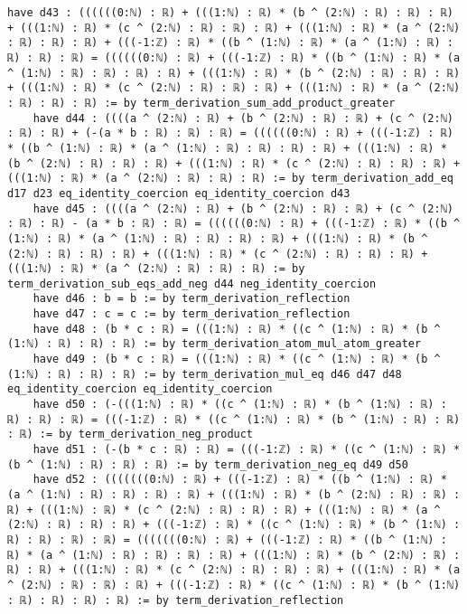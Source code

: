\documentclass{article}
\begin{document}
\begin{tcolorbox}[colback=white!10, width=\linewidth]
\begin{lstlisting}[language=Lean4]
    have d43 : ((((((0:ℕ) : ℝ) + (((1:ℕ) : ℝ) * (b ^ (2:ℕ) : ℝ) : ℝ) : ℝ) + (((1:ℕ) : ℝ) * (c ^ (2:ℕ) : ℝ) : ℝ) : ℝ) + (((1:ℕ) : ℝ) * (a ^ (2:ℕ) : ℝ) : ℝ) : ℝ) + (((-1:ℤ) : ℝ) * ((b ^ (1:ℕ) : ℝ) * (a ^ (1:ℕ) : ℝ) : ℝ) : ℝ) : ℝ) = ((((((0:ℕ) : ℝ) + (((-1:ℤ) : ℝ) * ((b ^ (1:ℕ) : ℝ) * (a ^ (1:ℕ) : ℝ) : ℝ) : ℝ) : ℝ) + (((1:ℕ) : ℝ) * (b ^ (2:ℕ) : ℝ) : ℝ) : ℝ) + (((1:ℕ) : ℝ) * (c ^ (2:ℕ) : ℝ) : ℝ) : ℝ) + (((1:ℕ) : ℝ) * (a ^ (2:ℕ) : ℝ) : ℝ) : ℝ) := by term_derivation_sum_add_product_greater
    have d44 : ((((a ^ (2:ℕ) : ℝ) + (b ^ (2:ℕ) : ℝ) : ℝ) + (c ^ (2:ℕ) : ℝ) : ℝ) + (-(a * b : ℝ) : ℝ) : ℝ) = ((((((0:ℕ) : ℝ) + (((-1:ℤ) : ℝ) * ((b ^ (1:ℕ) : ℝ) * (a ^ (1:ℕ) : ℝ) : ℝ) : ℝ) : ℝ) + (((1:ℕ) : ℝ) * (b ^ (2:ℕ) : ℝ) : ℝ) : ℝ) + (((1:ℕ) : ℝ) * (c ^ (2:ℕ) : ℝ) : ℝ) : ℝ) + (((1:ℕ) : ℝ) * (a ^ (2:ℕ) : ℝ) : ℝ) : ℝ) := by term_derivation_add_eq d17 d23 eq_identity_coercion eq_identity_coercion d43
    have d45 : ((((a ^ (2:ℕ) : ℝ) + (b ^ (2:ℕ) : ℝ) : ℝ) + (c ^ (2:ℕ) : ℝ) : ℝ) - (a * b : ℝ) : ℝ) = ((((((0:ℕ) : ℝ) + (((-1:ℤ) : ℝ) * ((b ^ (1:ℕ) : ℝ) * (a ^ (1:ℕ) : ℝ) : ℝ) : ℝ) : ℝ) + (((1:ℕ) : ℝ) * (b ^ (2:ℕ) : ℝ) : ℝ) : ℝ) + (((1:ℕ) : ℝ) * (c ^ (2:ℕ) : ℝ) : ℝ) : ℝ) + (((1:ℕ) : ℝ) * (a ^ (2:ℕ) : ℝ) : ℝ) : ℝ) := by term_derivation_sub_eqs_add_neg d44 neg_identity_coercion
    have d46 : b = b := by term_derivation_reflection
    have d47 : c = c := by term_derivation_reflection
    have d48 : (b * c : ℝ) = (((1:ℕ) : ℝ) * ((c ^ (1:ℕ) : ℝ) * (b ^ (1:ℕ) : ℝ) : ℝ) : ℝ) := by term_derivation_atom_mul_atom_greater
    have d49 : (b * c : ℝ) = (((1:ℕ) : ℝ) * ((c ^ (1:ℕ) : ℝ) * (b ^ (1:ℕ) : ℝ) : ℝ) : ℝ) := by term_derivation_mul_eq d46 d47 d48 eq_identity_coercion eq_identity_coercion
    have d50 : (-(((1:ℕ) : ℝ) * ((c ^ (1:ℕ) : ℝ) * (b ^ (1:ℕ) : ℝ) : ℝ) : ℝ) : ℝ) = (((-1:ℤ) : ℝ) * ((c ^ (1:ℕ) : ℝ) * (b ^ (1:ℕ) : ℝ) : ℝ) : ℝ) := by term_derivation_neg_product
    have d51 : (-(b * c : ℝ) : ℝ) = (((-1:ℤ) : ℝ) * ((c ^ (1:ℕ) : ℝ) * (b ^ (1:ℕ) : ℝ) : ℝ) : ℝ) := by term_derivation_neg_eq d49 d50
    have d52 : (((((((0:ℕ) : ℝ) + (((-1:ℤ) : ℝ) * ((b ^ (1:ℕ) : ℝ) * (a ^ (1:ℕ) : ℝ) : ℝ) : ℝ) : ℝ) + (((1:ℕ) : ℝ) * (b ^ (2:ℕ) : ℝ) : ℝ) : ℝ) + (((1:ℕ) : ℝ) * (c ^ (2:ℕ) : ℝ) : ℝ) : ℝ) + (((1:ℕ) : ℝ) * (a ^ (2:ℕ) : ℝ) : ℝ) : ℝ) + (((-1:ℤ) : ℝ) * ((c ^ (1:ℕ) : ℝ) * (b ^ (1:ℕ) : ℝ) : ℝ) : ℝ) : ℝ) = (((((((0:ℕ) : ℝ) + (((-1:ℤ) : ℝ) * ((b ^ (1:ℕ) : ℝ) * (a ^ (1:ℕ) : ℝ) : ℝ) : ℝ) : ℝ) + (((1:ℕ) : ℝ) * (b ^ (2:ℕ) : ℝ) : ℝ) : ℝ) + (((1:ℕ) : ℝ) * (c ^ (2:ℕ) : ℝ) : ℝ) : ℝ) + (((1:ℕ) : ℝ) * (a ^ (2:ℕ) : ℝ) : ℝ) : ℝ) + (((-1:ℤ) : ℝ) * ((c ^ (1:ℕ) : ℝ) * (b ^ (1:ℕ) : ℝ) : ℝ) : ℝ) : ℝ) := by term_derivation_reflection

\end{lstlisting}
\end{tcolorbox}
\end{document}
